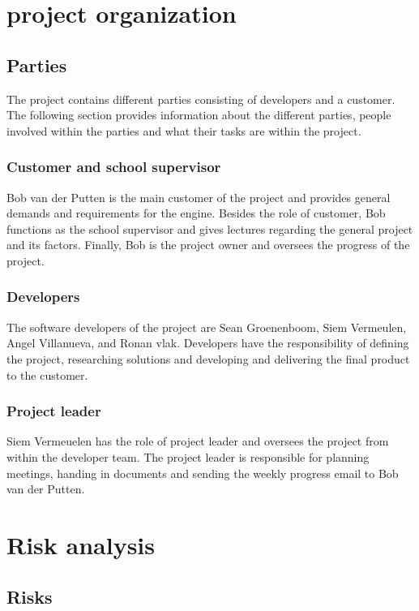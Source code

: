 \documentclass{article} %
\begin{document}
\section{project organization}

\subsection{Parties}
The project contains different parties consisting of developers and a customer.
The following section provides information about the different parties, people involved within the parties and what their tasks are within the project.

\subsubsection{Customer and school supervisor}
Bob van der Putten is the main customer of the project and provides general demands and requirements for the engine.
Besides the role of customer, Bob functions as the school supervisor and gives lectures regarding the general project and its factors.
Finally, Bob is the project owner and oversees the progress of the project.


\subsubsection{Developers}
The software developers of the project are Sean Groenenboom, Siem Vermeulen, Angel Villanueva, and Ronan vlak.
Developers have the responsibility of defining the project, researching solutions and developing and delivering the final product to the customer.


\subsubsection{Project leader}
Siem Vermeuelen has the role of project leader and oversees the project from within the developer team.
The project leader is responsible for planning meetings, handing in documents and sending the weekly progress email to Bob van der Putten.


\newpage

\section{Risk analysis}

\subsection{Risks}
\end{document}
